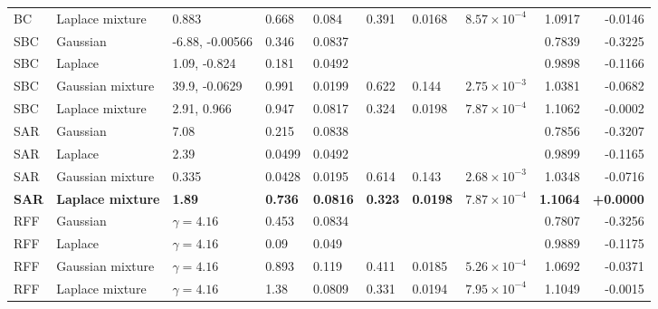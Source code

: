 \begin{longtable}{llllllllrr}
BC & Laplace mixture & 0.883 & 0.668 & 0.084 & 0.391 & 0.0168 & $8.57\times10^{-4}$ & 1.0917 & -0.0146 \\
SBC & Gaussian & -6.88, -0.00566 & 0.346 & 0.0837 &  &  &  & 0.7839 & -0.3225 \\
SBC & Laplace & 1.09, -0.824 & 0.181 & 0.0492 &  &  &  & 0.9898 & -0.1166 \\
SBC & Gaussian mixture & 39.9, -0.0629 & 0.991 & 0.0199 & 0.622 & 0.144 & $2.75\times10^{-3}$ & 1.0381 & -0.0682 \\
SBC & Laplace mixture & 2.91, 0.966 & 0.947 & 0.0817 & 0.324 & 0.0198 & $7.87\times10^{-4}$ & 1.1062 & -0.0002 \\
SAR & Gaussian & 7.08 & 0.215 & 0.0838 &  &  &  & 0.7856 & -0.3207 \\
SAR & Laplace & 2.39 & 0.0499 & 0.0492 &  &  &  & 0.9899 & -0.1165 \\
SAR & Gaussian mixture & 0.335 & 0.0428 & 0.0195 & 0.614 & 0.143 & $2.68\times10^{-3}$ & 1.0348 & -0.0716 \\
\textbf{SAR} & \textbf{Laplace mixture} & \textbf{1.89} & \textbf{0.736} & \textbf{0.0816} & \textbf{0.323} & \textbf{0.0198} & \textbf{$7.87\times10^{-4}$} & \textbf{1.1064} & \textbf{+0.0000} \\
RFF & Gaussian & $\gamma=4.16$ & 0.453 & 0.0834 &  &  &  & 0.7807 & -0.3256 \\
RFF & Laplace & $\gamma=4.16$ & 0.09 & 0.049 &  &  &  & 0.9889 & -0.1175 \\
RFF & Gaussian mixture & $\gamma=4.16$ & 0.893 & 0.119 & 0.411 & 0.0185 & $5.26\times10^{-4}$ & 1.0692 & -0.0371 \\
RFF & Laplace mixture & $\gamma=4.16$ & 1.38 & 0.0809 & 0.331 & 0.0194 & $7.95\times10^{-4}$ & 1.1049 & -0.0015 \\
\bottomrule
\end{longtable}
